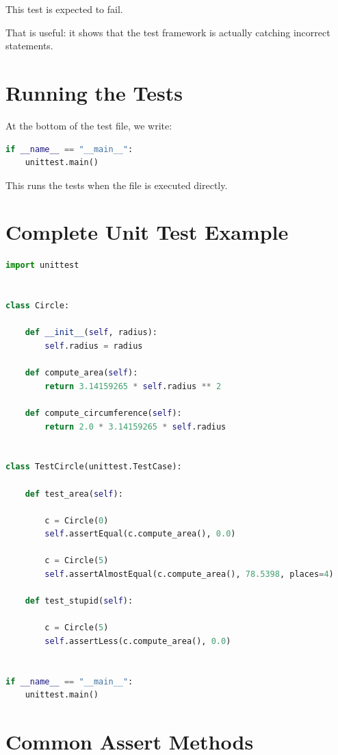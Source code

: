 \documentclass[11pt]{article}
\begin{document}
This test is expected to fail.

That is useful: it shows that the test framework is actually catching incorrect statements.

\section{Running the Tests}

At the bottom of the test file, we write:

\begin{lstlisting}[language=Python]
if __name__ == "__main__":
    unittest.main()
\end{lstlisting}

This runs the tests when the file is executed directly.

\section{Complete Unit Test Example}

\begin{lstlisting}[language=Python]
import unittest


class Circle:

    def __init__(self, radius):
        self.radius = radius

    def compute_area(self):
        return 3.14159265 * self.radius ** 2

    def compute_circumference(self):
        return 2.0 * 3.14159265 * self.radius


class TestCircle(unittest.TestCase):

    def test_area(self):

        c = Circle(0)
        self.assertEqual(c.compute_area(), 0.0)

        c = Circle(5)
        self.assertAlmostEqual(c.compute_area(), 78.5398, places=4)

    def test_stupid(self):

        c = Circle(5)
        self.assertLess(c.compute_area(), 0.0)


if __name__ == "__main__":
    unittest.main()
\end{lstlisting}

\section{Common Assert Methods}
\end{document}
